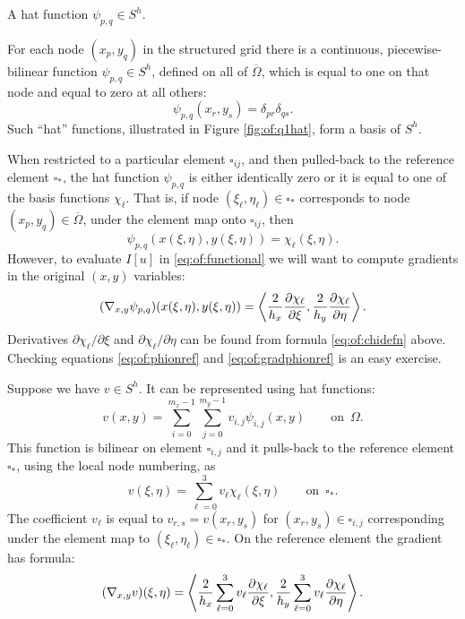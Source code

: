 \begin{marginfigure}

\caption{A hat function $\psi_{p,q} \in S^h$.}
\label{fig:of:q1hat}
\end{marginfigure}

For each node $(x_p,y_q)$ in the structured grid there is a continuous, piecewise-bilinear function $\psi_{p,q} \in S^h$, defined on all of $\overline\Omega$, which is equal to one on that node and equal to zero at all others:
\begin{equation}
  \psi_{p,q}(x_r,y_s) = \delta_{pr} \delta_{qs}.  \label{eq:of:psinodewise}
\end{equation}
Such ``hat'' functions, illustrated in Figure \ref{fig:of:q1hat}, form a basis of $S^h$.

When restricted to a particular element $\square_{ij}$, and then pulled-back to the reference element $\square_\ast$, the hat function $\psi_{p,q}$ is either identically zero or it is equal to one of the basis functions $\chi_\ell$.  That is, if node $(\xi_\ell,\eta_\ell) \in \square_\ast$ corresponds to node $(x_p,y_q) \in \overline\Omega$, under the element map onto $\square_{ij}$, then 
\begin{equation}
  \psi_{p,q}(x(\xi,\eta),y(\xi,\eta)) = \chi_\ell(\xi,\eta).  \label{eq:of:phionref}
\end{equation}
However, to evaluate $I[u]$ in \eqref{eq:of:functional} we will want to compute gradients in the original $(x,y)$ variables:
\begin{equation}
  (\nabla_{x,y} \psi_{p,q})(x(\xi,\eta),y(\xi,\eta)) = \left<\frac{2}{h_x}\frac{\partial\chi_\ell}{\partial \xi},\frac{2}{h_y}\frac{\partial\chi_\ell}{\partial \eta}\right>.   \label{eq:of:gradphionref}
\end{equation}
Derivatives $\partial\chi_\ell/\partial \xi$ and $\partial\chi_\ell/\partial \eta$ can be found from formula \eqref{eq:of:chidefn} above.  Checking equations \eqref{eq:of:phionref} and \eqref{eq:of:gradphionref} is an easy exercise.

Suppose we have $v \in S^h$.  It can be represented using hat functions:
\begin{equation}
v(x,y) = \sum_{i=0}^{m_x-1} \sum_{j=0}^{m_y-1} v_{i,j} \psi_{i,j}(x,y)  \qquad \text{on } \,\Omega. \label{eq:of:bilinearrepresentation}
\end{equation}
This function is bilinear on element $\square_{i,j}$ and it pulls-back to the reference element $\square_\ast$, using the local node numbering, as
\begin{equation}
v(\xi,\eta) = \sum_{\ell=0}^3 v_\ell \chi_\ell(\xi,\eta)  \qquad \text{on } \,\square_\ast. \label{eq:of:bilinearref}
\end{equation}
The coefficient $v_\ell$ is equal to $v_{r,s} = v(x_r,y_s)$ for $(x_r,y_s)\in\square_{i,j}$ corresponding under the element map to $(\xi_\ell,\eta_\ell) \in \square_\ast$.  On the reference element the gradient has formula:
\begin{equation}
  (\nabla_{x,y} v)(\xi,\eta) = \left<\frac{2}{h_x} \sum_{\ell=0}^3 v_\ell \frac{\partial\chi_\ell}{\partial \xi}, \frac{2}{h_y} \sum_{\ell=0}^3 v_\ell \frac{\partial\chi_\ell}{\partial \eta}\right>. \label{eq:of:gradrepref}
\end{equation}


